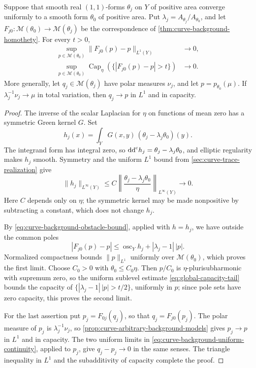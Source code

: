 \begin{corollary}\label{cor:curve-varying-background-continuity}
Suppose that smooth real $(1,1)$-forms $\theta_j$ on $Y$ of positive area converge uniformly to a smooth form $\theta_0$ of positive area. Put $\lambda_j=A_{\theta_j}/A_{\theta_0}$, and let $F_{j0}\colon\mathcal M(\theta_0)\to\mathcal M(\theta_j)$ be the correspondence of \cref{thm:curve-background-homothety}. For every $t>0$,
\begin{equation}\label{eq:curve-background-uniform-continuity}
 \begin{split}
 \sup_{p\in\mathcal M(\theta_0)}
       \|F_{j0}(p)-p\|_{L^1(Y)}&\longrightarrow0,\\
 \sup_{p\in\mathcal M(\theta_0)}
       \operatorname{Cap}_\eta(\{|F_{j0}(p)-p|>t\})&\longrightarrow0.
 \end{split}
\end{equation}
More generally, let $q_j\in\mathcal M(\theta_j)$ have polar measures $\nu_j$, and let $p=p_{\theta_0}(\mu)$. If $\lambda_j^{-1}\nu_j\to\mu$ in total variation, then $q_j\to p$ in $L^1$ and in capacity.
\end{corollary}
\begin{proof}
The inverse of the scalar Laplacian for $\eta$ on functions of mean zero has a symmetric Green kernel $G$. Set
\[
 h_j(x)=\int_YG(x,y)\,(\theta_j-\lambda_j\theta_0)(y).
\]
The integrand form has integral zero, so $\mathrm{dd}^{\mathrm{c}} h_j=\theta_j-\lambda_j\theta_0$, and elliptic regularity makes $h_j$ smooth. Symmetry and the uniform $L^1$ bound from \cref{sec:curve-trace-realization} give
\[
 \|h_j\|_{L^\infty(Y)}
 \leq C\left\|\frac{\theta_j-\lambda_j\theta_0}{\eta}\right\|_{L^\infty(Y)}
 \longrightarrow0.
\]
Here $C$ depends only on $\eta$; the symmetric kernel may be made nonpositive by subtracting a constant, which does not change $h_j$.

By \eqref{eq:curve-background-obstacle-bound}, applied with $h=h_j$, we have outside the common poles
\[
 |F_{j0}(p)-p|\leq\operatorname{osc}_Yh_j+|\lambda_j-1|\,|p|.
\]
Normalized compactness bounds $\|p\|_{L^1}$ uniformly over $\mathcal M(\theta_0)$, which proves the first limit. Choose $C_0>0$ with $\theta_0\leq C_0\eta$. Then $p/C_0$ is $\eta$-plurisubharmonic with supremum zero, so the uniform sublevel estimate \eqref{eq:global-capacity-tail} bounds the capacity of $\{|\lambda_j-1|\,|p|>t/2\}$, uniformly in $p$; since pole sets have zero capacity, this proves the second limit.

For the last assertion put $p_j=F_{0j}(q_j)$, so that $q_j=F_{j0}(p_j)$. The polar measure of $p_j$ is $\lambda_j^{-1}\nu_j$, so \cref{prop:curve-arbitrary-background-models} gives $p_j\to p$ in $L^1$ and in capacity. The two uniform limits in \eqref{eq:curve-background-uniform-continuity}, applied to $p_j$, give $q_j-p_j\to0$ in the same senses. The triangle inequality in $L^1$ and the subadditivity of capacity complete the proof.
\end{proof}

